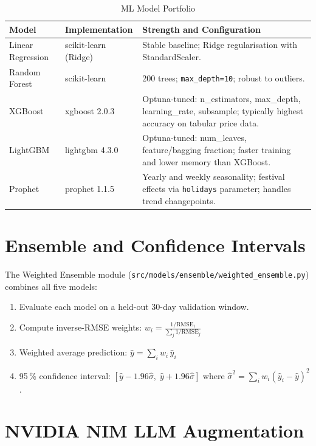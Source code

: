 \documentclass[12pt, a4paper, oneside]{report}
\begin{document}
\begin{table}[H]
\centering
\caption{ML Model Portfolio}
\label{tab:models}
\begin{tabularx}{\textwidth}{@{} L{3.0cm} L{3.0cm} X @{}}
\toprule
\textbf{Model} & \textbf{Implementation} & \textbf{Strength and Configuration} \\
\midrule
Linear Regression
  & scikit-learn (Ridge)
  & Stable baseline; Ridge regularisation with StandardScaler. \\[4pt]
Random Forest
  & scikit-learn
  & 200 trees; \texttt{max\_depth=10}; robust to outliers. \\[4pt]
XGBoost
  & xgboost 2.0.3
  & Optuna-tuned: n\_estimators, max\_depth, learning\_rate, subsample;
    typically highest accuracy on tabular price data. \\[4pt]
LightGBM
  & lightgbm 4.3.0
  & Optuna-tuned: num\_leaves, feature/bagging fraction;
    faster training and lower memory than XGBoost. \\[4pt]
Prophet
  & prophet 1.1.5
  & Yearly and weekly seasonality; festival effects via
    \texttt{holidays} parameter; handles trend changepoints. \\
\bottomrule
\end{tabularx}
\end{table}

\section{Ensemble and Confidence Intervals}

The Weighted Ensemble module (\texttt{src/models/ensemble/weighted\_ensemble.py})
combines all five models:

\begin{enumerate}
  \item Evaluate each model on a held-out 30-day validation window.
  \item Compute inverse-RMSE weights:
        $w_i = \frac{1/\text{RMSE}_i}{\sum_{j} 1/\text{RMSE}_j}$
  \item Weighted average prediction:
        $\hat{y} = \sum_{i} w_i\,\hat{y}_i$
  \item 95\,\% confidence interval:
        $[\hat{y} - 1.96\hat{\sigma},\; \hat{y} + 1.96\hat{\sigma}]$
        where $\hat{\sigma}^2 = \sum_{i} w_i(\hat{y}_i - \hat{y})^2$.
\end{enumerate}

\section{NVIDIA NIM LLM Augmentation}
\end{document}
